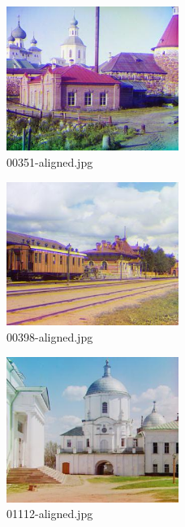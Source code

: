 \documentclass[10pt,letterpaper]{article}
\begin{document}
\begin{figure}[h]
\centering
\includegraphics[width=0.5\textwidth]{output/prokudin-gorskii/00351-aligned.jpg}
\caption{00351-aligned.jpg}
\end{figure}

\begin{figure}[h]
\centering
\includegraphics[width=0.5\textwidth]{output/prokudin-gorskii/00398-aligned.jpg}
\caption{00398-aligned.jpg}
\end{figure}

\begin{figure}[h]
\centering
\includegraphics[width=0.5\textwidth]{output/prokudin-gorskii/01112-aligned.jpg}
\caption{01112-aligned.jpg}
\end{figure}
\end{document}

